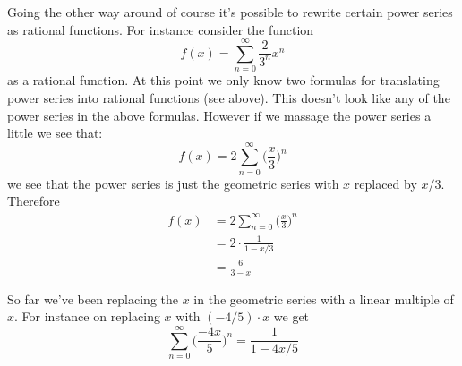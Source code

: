 \begin{comment}
\begin{ex} \starprob
This is an aside:
Write a program to extract the $n$-th coefficient from the power series
of a function. 
For instance suppose a function \texttt{f(x)} is already
written in a programming language.
How would you write a function to extract the coefficient of $x^{100}$ in 
the power series of $f$?
[Hint: Let $f(x) = a_0 + a_1x + \cdots$. Then we get $a_0$ very easily:
$a_0 = f(0)$. But what about the rest?
$f(x) - a_0 = a_1x + a_2x^2 + \cdots$.
How would you approximate $a_1$? Well from the above you get this:
\[
\frac{f(x) - a_0}{x} = a_1 + a_2x^1 + a_3x^2 + \cdots
\]
Now what?
What about $a_2$? $a_3$? etc.
If you have taken calc, does this remind you of something?
Maclaurin series? Taylor series?]
\end{ex}
\end{comment}

\newpage
\newpage
\newpage

\newpage
Going the other way around of course it's possible to 
rewrite certain power series as rational functions.
For instance consider the function
\[
f(x) = \sum_{n=0}^\infty \frac{2}{3^n} x^n
\]
as a rational function.
At this point we only know two formulas for translating
power series into rational functions (see above).
This doesn't look like any of the power series
in the above formulas.
However if we massage the power series a little we see that:
\[
f(x) = 2 \sum_{n=0}^\infty \biggl( \frac{x}{3} \biggr)^n
\]
we see that the power series is just the geometric series with
$x$ replaced by $x/3$.
Therefore
\begin{align*}
f(x) 
&= 2 \sum_{n=0}^\infty \biggl( \frac{x}{3} \biggr)^n \\
&= 2 \cdot \frac{1}{1 - x/3} \\
&= \frac{6}{3 - x}
\end{align*}

\newpage
\newpage
\newpage
\newpage
\newpage
\newpage

\newpage
So far we've been replacing the $x$ in the geometric series with
a linear multiple of $x$.
For instance on replacing $x$ with $(-4/5) \cdot x$ we get
\[
\sum_{n=0}^\infty \biggl( \frac{-4x}{5} \biggr)^n = \frac{1}{1 - 4x/5}
\]

